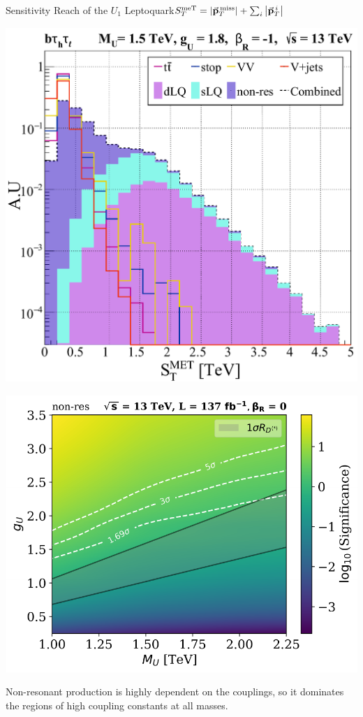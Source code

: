 \documentclass{../bredelebeamer}
\begin{document}
\begin{frame}{Sensitivity Reach of the $U_1$ Leptoquark}{$S_T^{\text{meT}}=\left|\va p_{T}^{\,\text{miss}}\right| + \sum_i\left|\va p_{T}^{\,i}\right|$}
	\begin{minipage}{.43\linewidth}
			\includegraphics[width=\linewidth]{../2023_paper/sTTeV_semileptonic_sLQ_wRHC.pdf}

	\end{minipage}
	\begin{minipage}{.56\linewidth}
		\includegraphics[width=\linewidth]{../2023_paper/Significance_Heatmap_13TeV_L137_non-res_combined_woRHC.pdf}


	\end{minipage}

	{\large

		  Non-resonant production is highly dependent on the couplings, so it dominates the regions of high coupling constants at all masses.
	}
\end{frame}
\end{document}
